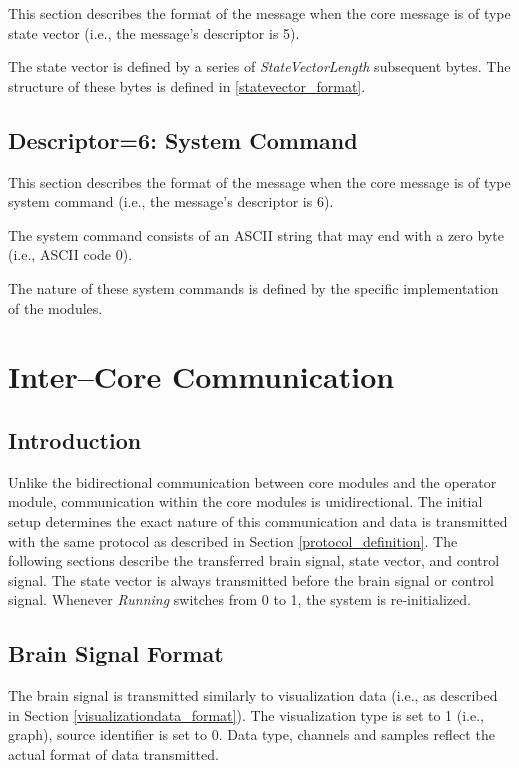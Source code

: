 \documentclass[letterpaper,oneside,12pt]{book}
\begin{document}
This section describes the format of the message when the core message is of 
type state vector (i.e., the message's descriptor is 5). 

The state vector is defined by a series of \textit{StateVectorLength} subsequent 
bytes. The structure of these bytes is defined in \ref{statevector_format}.


\subsection{Descriptor=6: System Command}
\label{sec:syscmd}

This section describes the format of the message when the core message is of 
type system command (i.e., the message's descriptor is 6). 

The system command consists of an ASCII string that may end with a zero byte 
(i.e., ASCII code 0).

The nature of these system commands is defined by the specific implementation of 
the modules.


\section{Inter--Core Communication}

\subsection{Introduction}

Unlike the bidirectional communication between core modules and the operator 
module, communication within the core modules is unidirectional. The initial 
setup determines the exact nature of this communication and data is transmitted 
with the same protocol as described in Section \ref{protocol_definition}. The 
following sections describe the transferred brain signal, state vector, and 
control signal. The state vector is always transmitted before the brain 
signal or control signal. Whenever \textit{Running} switches from 0 to 1, the 
system is re-initialized.

\subsection{Brain Signal Format}
\label{sec:eegsigformat}

The brain signal is transmitted similarly to visualization data (i.e., as 
described in Section \ref{visualizationdata_format}). The visualization type is 
set to 1 (i.e., graph), source identifier is set to 0. Data type, channels and samples reflect the actual format of data transmitted.
\end{document}
